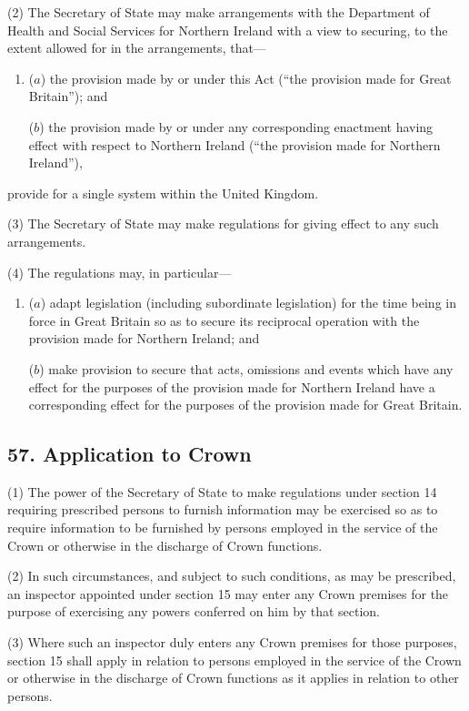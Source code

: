 \documentclass[12pt,a4paper]{article}
\begin{document}
(2) The Secretary of State may make arrangements with the Department of Health and Social Services for Northern Ireland with a view to securing, to the extent allowed for in the arrangements, that—
\begin{enumerate}\item[]
($a$) the provision made by or under this Act (“the provision made for Great Britain”); and

($b$) the provision made by or under any corresponding enactment having effect with respect to Northern Ireland (“the provision made for Northern Ireland”),
\end{enumerate}
provide for a single system within the United Kingdom.

(3) The Secretary of State may make regulations for giving effect to any such arrangements.

(4) The regulations may, in particular—
\begin{enumerate}\item[]
($a$) adapt legislation (including subordinate legislation) for the time being in force in Great Britain so as to secure its reciprocal operation with the provision made for Northern Ireland; and

($b$) make provision to secure that acts, omissions and events which have any effect for the purposes of the provision made for Northern Ireland have a corresponding effect for the purposes of the provision made for Great Britain.
\end{enumerate}


\subsection{57. Application to Crown}

(1) The power of the Secretary of State to make regulations under section 14 requiring prescribed persons to furnish information may be exercised so as to require information to be furnished by persons employed in the service of the Crown or otherwise in the discharge of Crown functions.

(2) In such circumstances, and subject to such conditions, as may be prescribed, an inspector appointed under section 15 may enter any Crown premises for the purpose of exercising any powers conferred on him by that section.

(3) Where such an inspector duly enters any Crown premises for those purposes, section 15 shall apply in relation to persons employed in the service of the Crown or otherwise in the discharge of Crown functions as it applies in relation to other persons.
\end{document}

